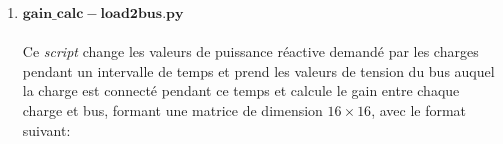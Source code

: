 \begin{enumerate}[\bfseries 4.3.1]
	\item $\mathbf{gain\_calc-load2bus.py}$\\
	\\Ce \textit{script} change les valeurs de puissance réactive demandé par les charges pendant un intervalle de temps et prend les valeurs de tension du bus auquel la charge est connecté pendant ce temps et calcule le gain entre chaque charge et bus, formant une matrice de dimension $ 16\times16 $, avec le format suivant:
	\\	\begin{table}[H]\tiny
		\captionsetup{justification=centering,margin=0cm}
		\caption{Matrice des Gain de sortie du \textit{script} $gain\_calc-load2bus.py$.}
		\centering
\end{table}
\end{enumerate}
